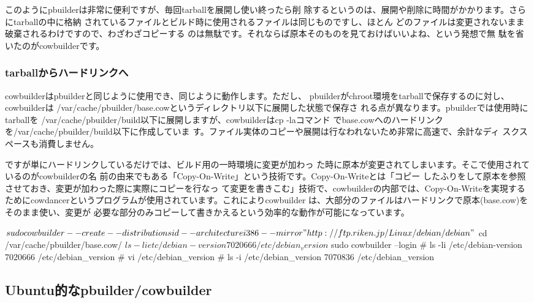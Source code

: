 \documentclass[mingoth,a4paper]{jsarticle}
\begin{document}
このようにpbuilderは非常に便利ですが、毎回tarballを展開し使い終ったら削
除するというのは、展開や削除に時間がかかります。さらにtarballの中に格納
されているファイルとビルド時に使用されるファイルは同じものですし、ほとん
どのファイルは変更されないまま破棄されるわけですので、わざわざコピーする
のは無駄です。それならば原本そのものを見ておけばいいよね、という発想で無
駄を省いたのがcowbuilderです。

\subsubsection{tarballからハードリンクへ}

cowbuilderはpbuilderと同じように使用でき、同じように動作します。ただし、
pbuilderがchroot環境をtarballで保存するのに対し、cowbuilderは
/var/cache/pbuilder/base.cowというディレクトリ以下に展開した状態で保存さ
れる点が異なります。pbuilderでは使用時にtarballを
/var/cache/pbuilder/build以下に展開しますが、cowbuilderはcp -laコマンド
でbase.cowへのハードリンクを/var/cache/pbuilder/build以下に作成していま
す。ファイル実体のコピーや展開は行なわれないため非常に高速で、余計なディ
スクスペースも消費しません。

ですが単にハードリンクしているだけでは、ビルド用の一時環境に変更が加わっ
た時に原本が変更されてしまいます。そこで使用されているのがcowbuilderの名
前の由来でもある「Copy-On-Write」という技術です。Copy-On-Writeとは「コピー
したふりをして原本を参照させておき、変更が加わった際に実際にコピーを行なっ
て変更を書きこむ」技術で、cowbuilderの内部では、Copy-On-Writeを実現する
ためにcowdancerというプログラムが使用されています。これによりcowbuilder
は、大部分のファイルはハードリンクで原本(base.cow)をそのまま使い、変更が
必要な部分のみコピーして書きかえるという効率的な動作が可能になっています。

\begin{commandline}
$ sudo cowbuilder --create --distribution sid --architecture i386 --mirror "http://ftp.riken.jp/Linux/debian/debian"
$ cd /var/cache/pbuilder/base.cow/
$ ls -li etc/debian-version
7020666 /etc/debian_version
$ sudo cowbuilder --login
# ls -li /etc/debian-version
7020666 /etc/debian_version
# vi /etc/debian_version
# ls -i /etc/debian_version
7070836 /etc/debian_version
\end{commandline}

\subsection{Ubuntu的なpbuilder/cowbuilder}
\end{document}
